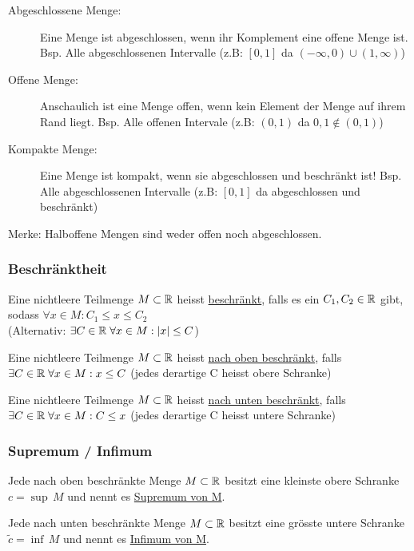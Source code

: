 \begin{description}
	\item [Abgeschlossene Menge:] Eine Menge ist abgeschlossen, wenn ihr Komplement eine offene Menge ist. Bsp. Alle abgeschlossenen Intervalle (z.B: $[0, 1]$ da $(-\infty, 0) \cup (1, \infty)$)

	\item [Offene Menge:] Anschaulich ist eine Menge offen, wenn kein Element der Menge auf ihrem Rand liegt. Bsp. Alle offenen Intervale (z.B: $(0, 1)$ da $0,1 \notin (0, 1)$)

	\item [Kompakte Menge:] Eine Menge ist kompakt, wenn sie abgeschlossen und beschränkt ist! Bsp. Alle abgeschlossenen Intervalle (z.B: $[0, 1]$ da abgeschlossen und beschränkt)
\end{description}
Merke: Halboffene Mengen sind weder offen noch abgeschlossen.

\subsubsection{Beschränktheit}
Eine nichtleere Teilmenge $M \subset \mathbb{R}$ heisst \underline{beschränkt}, falls es ein $C_1, C_2 \in \mathbb{R}$ gibt, sodass 
$\forall x \in M: C_1 \leq x \leq C_2$\\
(Alternativ: $\exists C \in \mathbb{R} \; \forall x \in M: |x| \leq C$)

\vspace{2pt}Eine nichtleere Teilmenge $M \subset \mathbb{R}$ heisst \underline{nach oben beschränkt}, falls 
$\exists C \in \mathbb{R} \; \forall x \in M: x \leq C$ \hspace{2pt} {\scriptsize(jedes derartige C heisst obere Schranke)}

\vspace{2pt}Eine nichtleere Teilmenge $M \subset \mathbb{R}$ heisst \underline{nach unten beschränkt}, falls 
$\exists C \in \mathbb{R} \; \forall x \in M: C \leq x$ \hspace{2pt} {\scriptsize(jedes derartige C heisst untere Schranke)}

\subsubsection{Supremum / Infimum}
Jede nach oben beschränkte Menge $M \subset \mathbb{R}$ besitzt eine kleinste obere Schranke $c = \sup \, M$ und nennt es \underline{Supremum von M}.

Jede nach unten beschränkte Menge $M \subset \mathbb{R}$ besitzt eine grösste untere Schranke $\tilde{c} = \inf \, M$ und nennt es \underline{Infimum von M}.


